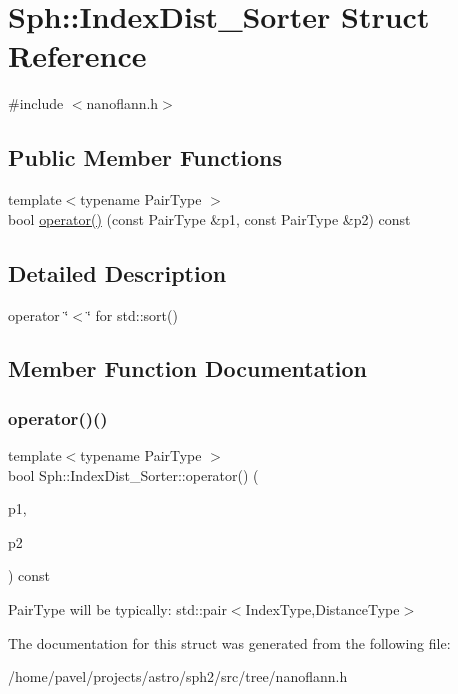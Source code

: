 \hypertarget{structSph_1_1IndexDist__Sorter}{}\section{Sph\+:\+:Index\+Dist\+\_\+\+Sorter Struct Reference}
\label{structSph_1_1IndexDist__Sorter}


{\ttfamily \#include $<$nanoflann.\+h$>$}

\subsection*{Public Member Functions}
\begin{DoxyCompactItemize}
\item 
{\footnotesize template$<$typename Pair\+Type $>$ }\\bool \hyperlink{structSph_1_1IndexDist__Sorter_a2f0133e7c5b4fa6c36975980ce8255c6}{operator()} (const Pair\+Type \&p1, const Pair\+Type \&p2) const
\end{DoxyCompactItemize}


\subsection{Detailed Description}
operator \char`\"{}$<$\char`\"{} for std\+::sort() 

\subsection{Member Function Documentation}
\hypertarget{structSph_1_1IndexDist__Sorter_a2f0133e7c5b4fa6c36975980ce8255c6}{}\label{structSph_1_1IndexDist__Sorter_a2f0133e7c5b4fa6c36975980ce8255c6} 
\subsubsection{\texorpdfstring{operator()()}{operator()()}}
{\footnotesize\ttfamily template$<$typename Pair\+Type $>$ \\
bool Sph\+::\+Index\+Dist\+\_\+\+Sorter\+::operator() (\begin{DoxyParamCaption}\item[{const Pair\+Type \&}]{p1,  }\item[{const Pair\+Type \&}]{p2 }\end{DoxyParamCaption}) const\hspace{0.3cm}{\ttfamily [inline]}}

Pair\+Type will be typically\+: std\+::pair$<$\+Index\+Type,\+Distance\+Type$>$ 

The documentation for this struct was generated from the following file\+:\begin{DoxyCompactItemize}
\item 
/home/pavel/projects/astro/sph2/src/tree/nanoflann.\+h\end{DoxyCompactItemize}
